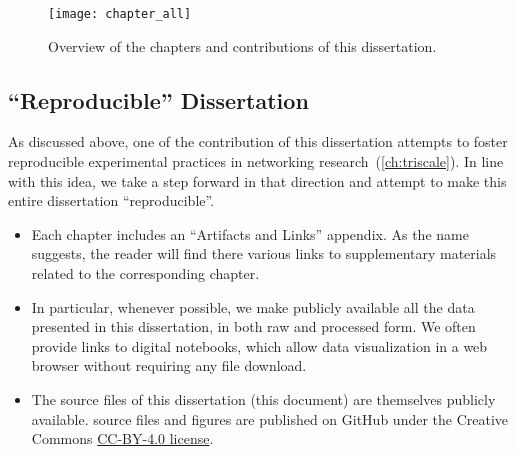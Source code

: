 \begin{figure}[!h]
  \centering
  \texttt{[image: chapter\_all]}
  \caption{Overview of the chapters and contributions of this dissertation.}
  \label{fig:chapter_all}
\end{figure}

\begin{subappendices}

\section{``Reproducible'' Dissertation}

As discussed above, one of the contribution of this dissertation attempts to foster reproducible experimental practices in networking research~(\cref{ch:triscale}).
In line with this idea, we take a step forward in that direction and attempt to make this entire dissertation ``reproducible''.

\begin{itemize}

	\item
	Each chapter includes an ``Artifacts and Links'' appendix. As the name suggests, the reader will find there various links to supplementary materials related to the corresponding chapter.

	\item
	In particular, whenever possible, we make publicly available all the data presented in this dissertation, in both raw and processed form.
	We often provide links to digital notebooks, which allow data visualization in a web browser without requiring any file download.

	\squarepar{%
		\item
		All the plots in this dissertation are ``clickable''; that is, the plots are hyperlinks pointing to dynamic visualizations which let the reader explore the data (\eg zooming-in and -out in the plot, toggle visibility of individual traces, \etc).
		If you are reading a printed version of this document, you can find the corresponding link addresses in the ``Artifacts and Links'' appendices.%
	}

	\item
	The source files of this dissertation (this document) are themselves publicly available.
	\tex source files and figures are published on GitHub under the Creative Commons \href{https://creativecommons.org/licenses/by/4.0/}{CC-BY-4.0 license}.


\end{itemize}
\end{subappendices}
